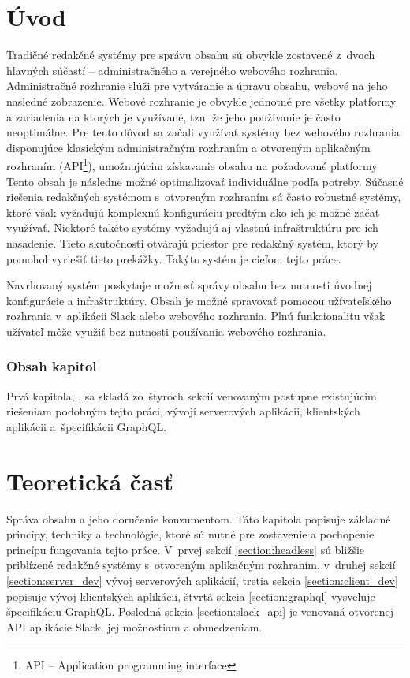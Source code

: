 \chapter{Úvod}
Tradičné redakčné systémy pre správu obsahu sú obvykle zostavené z~dvoch hlavných súčastí -- administračného a verejného webového rozhrania. Administračné rozhranie slúži pre vytváranie a úpravu obsahu, webové na jeho nasledné zobrazenie. Webové rozhranie je obvykle jednotné pre všetky platformy a zariadenia na ktorých je využívané, tzn. že jeho používanie je často neoptimálne. Pre tento dôvod sa začali využívať systémy bez webového rozhrania disponujúce klasickým administračným rozhraním a otvoreným aplikačným rozhraním (API\footnote{API -- Application programming interface}), umožnujúcim získavanie obsahu na požadované platformy. Tento obsah je následne možné optimalizovať individuálne podľa potreby. Súčasné riešenia redakčných systémom s~otvoreným rozhraním sú často robustné systémy, ktoré však vyžadujú komplexnú konfiguráciu predtým ako ich je možné začať využívať. Niektoré takéto systémy vyžadujú aj vlastnú infraštruktúru pre ich nasadenie. Tieto skutočnosti otvárajú priestor pre redakčný systém, ktorý by pomohol vyriešiť tieto prekážky. Takýto systém je cieľom tejto práce.

Navrhovaný systém poskytuje možnosť správy obsahu bez nutnosti úvodnej konfigurácie a infraštruktúry. Obsah je možné spravovať pomocou užívateľského rozhrania v~aplikácii Slack alebo webového rozhrania. Plnú funkcionalitu však užívateľ môže využiť bez nutnosti používania webového rozhrania.

\subsection*{Obsah kapitol}
Prvá kapitola, , sa skladá zo~štyroch sekcií venovaným postupne existujúcim riešeniam podobným tejto práci, vývoji serverových aplikácii, klientských aplikácii a~špecifikácii GraphQL.


\chapter{Teoretická časť}
\label{chapter:theory}
Správa obsahu a jeho doručenie konzumentom. Táto kapitola popisuje základné princípy, techniky a technológie, ktoré sú nutné pre zostavenie a pochopenie princípu fungovania tejto práce. V~prvej sekcií \ref{section:headless} sú bližšie priblízené redakčné systémy s~otvoreným aplikačným rozhraním, v~druhej sekcií \ref{section:server_dev} vývoj serverových aplikácií, tretia sekcia \ref{section:client_dev} popisuje vývoj klientských aplikácii, štvrtá sekcia \ref{section:graphql} vysveluje špecifikáciu GraphQL. Posledná sekcia \ref{section:slack_api} je venovaná otvorenej API aplikácie Slack, jej možnostiam a obmedzeniam.

